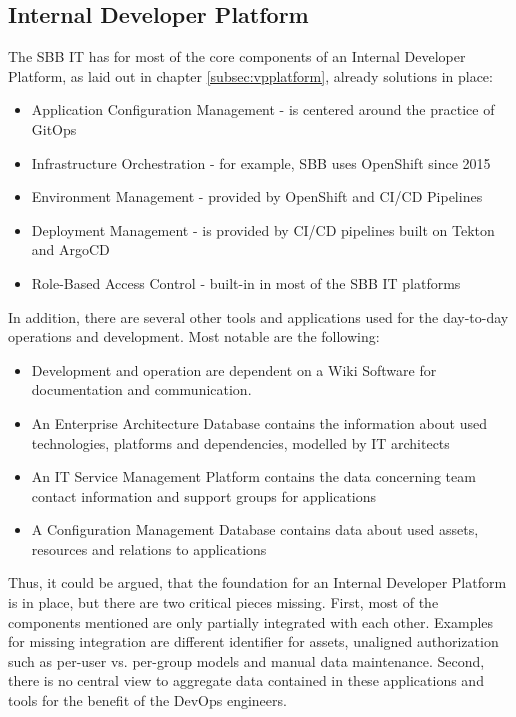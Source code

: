 \documentclass[a4paper,12pt]{article}
\begin{document}
    \subsection{Internal Developer Platform}
    \label{subsec:sbbplatform}
    The SBB IT has for most of the core components of an Internal Developer Platform, as laid out in chapter \ref{subsec:vpplatform},
    already solutions in place:
    \begin{itemize}
        \item Application Configuration Management - is centered around the practice of GitOps\parencite{hashicorpvault}
        \item Infrastructure Orchestration - for example, SBB uses OpenShift since 2015\parencite{rhsbbopenshift}
        \item Environment Management - provided by OpenShift and CI/CD Pipelines
        \item Deployment Management - is provided by CI/CD pipelines built on Tekton and ArgoCD\parencite{sbbtekton}
        \item Role-Based Access Control - built-in in most of the SBB IT platforms
    \end{itemize}
    In addition, there are several other tools and applications used for the day-to-day operations and development.
    Most notable are the following:
    \begin{itemize}
        \item Development and operation are dependent on a Wiki Software for documentation and communication.
        \item An Enterprise Architecture Database contains the information about used technologies, platforms and
        dependencies, modelled by IT architects
        \item An IT Service Management Platform contains the data concerning team contact information and support groups for applications
        \item A Configuration Management Database contains data about used assets, resources and relations to applications
    \end{itemize}
    Thus, it could be argued, that the foundation for an Internal Developer Platform is in place, but there are two
    critical pieces missing.
    First, most of the components mentioned are only partially integrated with each other.
    Examples for missing integration are different identifier for assets, unaligned authorization such as per-user vs.
    per-group models and manual data maintenance.
    Second, there is no central view to aggregate data contained in these applications and tools for the benefit of
    the DevOps engineers.
\end{document}
